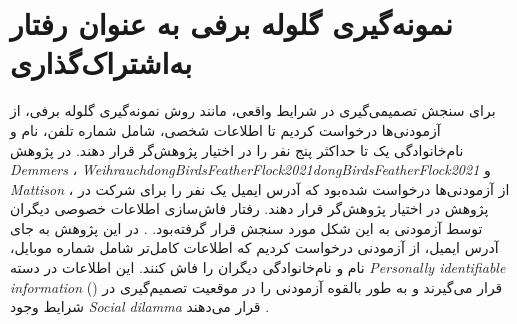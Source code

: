 \section{نمونه‌گیری گلوله برفی به عنوان رفتار به‌اشتراک‌گذاری}
برای سنجش تصمیمی‌گیری در شرایط واقعی، مانند روش نمونه‌گیری گلوله برفی، از آزمودنی‌ها درخواست 
کردیم تا اطلاعات شخصی، شامل شماره تلفن، نام و نام‌خانوادگی یک تا حداکثر پنج نفر را در اختیار پژوهش‌گر قرار دهند.
در پژوهش 
\textit{
	\gls{Demmers}
}،
\textit{
	\gls{Weihrauch}dongBirdsFeatherFlock2021dongBirdsFeatherFlock2021
} و 
\textit{
	\gls{Mattison}
}،
از آزمودنی‌ها درخواست شده‌بود که آدرس ایمیل یک نفر را برای شرکت در پژوهش 
در اختیار پژوهش‌گر قرار دهند. رفتار فاش‌سازی اطلاعات خصوصی دیگران توسط آزمودنی به این شکل مورد سنجش  قرار گرفته‌بود.
\citep{demmersYourDataNot2021}.
در این پژوهش به جای آدرس ایمیل، از آزمودنی درخواست کردیم که اطلاعات کامل‌تر شامل شماره موبایل، نام و نام‌خانوادگی دیگران 
را فاش کنند. این اطلاعات در دسته 
\textit{
	\gls{Personally identifiable information}
}()\citep{mccallisterGuideProtectingConfidentiality2010a}
قرار می‌گیرند و به طور بالقوه آزمودنی را در موقعیت  تصمیم‌گیری در شرایط وجود
\textit{
	\gls{Social dilamma}
}
قرار می‌دهند
\citep{sanfilippoGoverningPrivacyKnowledge2021,madisonChallengeCitiesGoverning2022,dongBirdsFeatherFlock2021}.